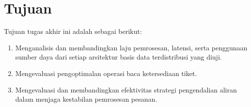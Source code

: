 \section{Tujuan}

Tujuan tugas akhir ini adalah sebagai berikut:

\begin{enumerate}
  \item Menganalisis dan membandingkan laju pemrosesan, latensi, serta penggunaan sumber daya dari setiap arsitektur basis data terdistribusi yang diuji.
  \item Mengevaluasi pengoptimalan operasi baca ketersediaan tiket.
  \item Mengevaluasi dan membandingkan efektivitas strategi pengendalian aliran dalam menjaga kestabilan pemrosesan pesanan.
\end{enumerate}
